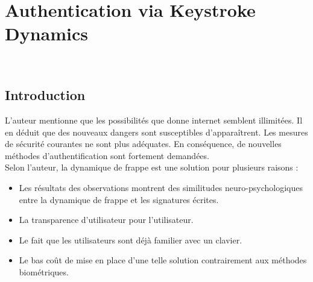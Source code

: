 \section{Authentication via Keystroke Dynamics\cite{monrose1997}}

\\





\subsection{Introduction}

L’auteur mentionne que les possibilités que donne internet semblent illimitées. Il en déduit que des nouveaux dangers sont susceptibles d'apparaîtrent. Les mesures de sécurité courantes ne sont plus adéquates. En conséquence, de nouvelles méthodes d’authentification sont fortement demandées.\\

Selon l’auteur, la dynamique de frappe est une solution pour plusieurs raisons :\\

\begin{itemize}
\item Les résultats des observations montrent des similitudes neuro-psychologiques entre la dynamique de frappe et les signatures écrites.
\item La transparence d'utilisateur pour l'utilisateur.
\item Le fait que les utilisateurs sont déjà familier avec un clavier.
\item Le bas coût de mise en place d’une telle solution contrairement aux méthodes biométriques.\\
\end{itemize}

